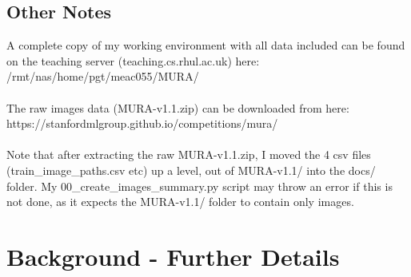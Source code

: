 \documentclass[11pt]{article} %
\theoremstyle{plain}
\theoremstyle{definition}
\begin{document}
\subsection{Other Notes}
A complete copy of my working environment with all data included can be found on the teaching server (teaching.cs.rhul.ac.uk) here:
\\
\noindent
/rmt/nas/home/pgt/meac055/MURA/
\\
\\
\noindent
The raw images data (MURA-v1.1.zip) can be downloaded from here:
\\
\noindent
https://stanfordmlgroup.github.io/competitions/mura/
\\
\\
\noindent
Note that after extracting the raw MURA-v1.1.zip, I moved the 4 csv files (train\_image\_paths.csv etc) up a level, out of MURA-v1.1/ into the docs/ folder. My 00\_create\_images\_summary.py script may throw an error if this is not done, as it expects the MURA-v1.1/ folder to contain only images. 

\section{Background - Further Details} \label{appendix-background}
\end{document}
